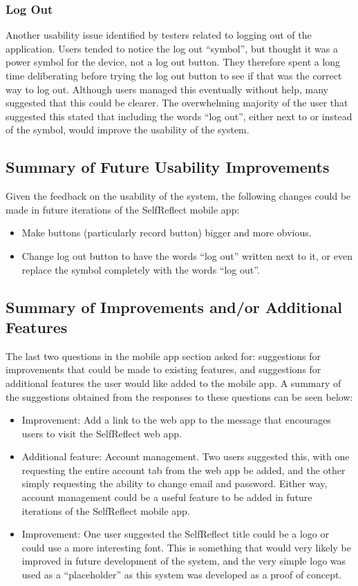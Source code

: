 \documentclass[11pt,openright,a4paper]{report}
\begin{document}
\subsubsection{Log Out}
Another usability issue identified by testers related to logging out of the application. Users tended to notice the log out \enquote{symbol}, but thought it was a power symbol for the device, not a log out button. They therefore spent a long time deliberating before trying the log out button to see if that was the correct way to log out. Although users managed this eventually without help, many suggested that this could be clearer. The overwhelming majority of the user that suggested this stated that including the words \enquote{log out}, either next to or instead of the symbol, would improve the usability of the system.

\subsection{Summary of Future Usability Improvements} \label{subsec:mobusabilityimp}
Given the feedback on the usability of the system, the following changes could be made in future iterations of the SelfReflect mobile app:
\begin{itemize}
\item Make buttons (particularly record button) bigger and more obvious.
\item Change log out button to have the words \enquote{log out} written next to it, or even replace the symbol completely with the words \enquote{log out}.
\end{itemize}

\subsection{Summary of Improvements and/or Additional Features}
The last two questions in the mobile app section asked for: suggestions for improvements that could be made to existing features, and suggestions for additional features the user would like added to the mobile app. A summary of the suggestions obtained from the responses to these questions can be seen below:
\begin{itemize}
\item Improvement: Add a link to the web app to the message that encourages users to visit the SelfReflect web app.
\item Additional feature: Account management. Two users suggested this, with one requesting the entire account tab from the web app be added, and the other simply requesting the ability to change email and password. Either way, account management could be a useful feature to be added in future iterations of the SelfReflect mobile app.
\item Improvement: One user suggested the SelfReflect title could be a logo or could use a more interesting font. This is something that would very likely be improved in future development of the system, and the very simple logo was used as a \enquote{placeholder} as this system was developed as a proof of concept.
\end{itemize}
\end{document}
